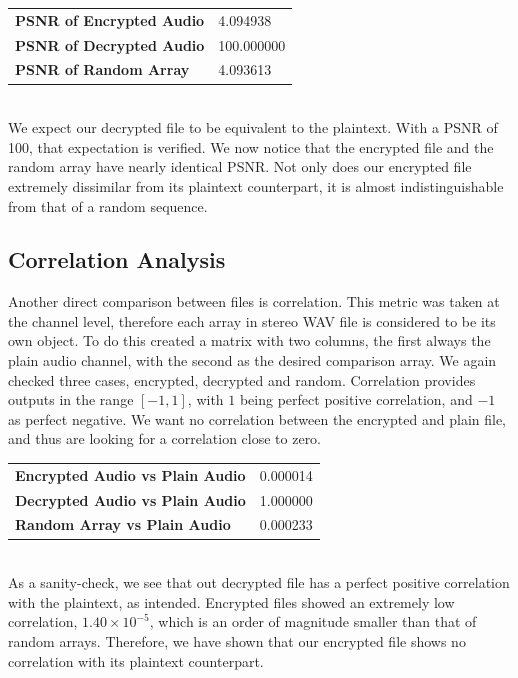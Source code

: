 \documentclass[conference]{IEEEtran}
\begin{document}
\begin{tabular}{|l|l|}
    \hline
    \textbf{PSNR of Encrypted Audio} & 4.094938 \\
    \textbf{PSNR of Decrypted Audio} & 100.000000 \\
    \textbf{PSNR of Random Array} & 4.093613 \\
    \hline
\end{tabular}
\\

We expect our decrypted file to be equivalent to the plaintext.
With a PSNR of 100, that expectation is verified.
We now notice that the encrypted file and the random array have nearly identical PSNR.
Not only does our encrypted file extremely dissimilar from its plaintext counterpart, it is almost indistinguishable from that of a random sequence.

\subsection{Correlation Analysis}\label{subsec:correlation-analysis}

Another direct comparison between files is correlation.
This metric was taken at the channel level, therefore each array in stereo WAV file is considered to be its own object.
To do this created a matrix with two columns, the first always the plain audio channel, with the second as the desired comparison array.
We again checked three cases, encrypted, decrypted and random.
Correlation provides outputs in the range $[-1, 1]$, with $1$ being perfect positive correlation, and $-1$ as perfect negative.
We want no correlation between the encrypted and plain file, and thus are looking for a correlation close to zero.

\begin{tabular}{|l|l|}
    \hline
    \textbf{Encrypted Audio vs Plain Audio} & 0.000014 \\
    \textbf{Decrypted Audio vs Plain Audio} & 1.000000 \\
    \textbf{Random Array vs Plain Audio} & 0.000233 \\
    \hline
\end{tabular}
\\

As a sanity-check, we see that out decrypted file has a perfect positive correlation with the plaintext, as intended.
Encrypted files showed an extremely low correlation, $1.40\times10^{-5}$, which is an order of magnitude smaller than that of random arrays.
Therefore, we have shown that our encrypted file shows no correlation with its plaintext counterpart.
\end{document}
